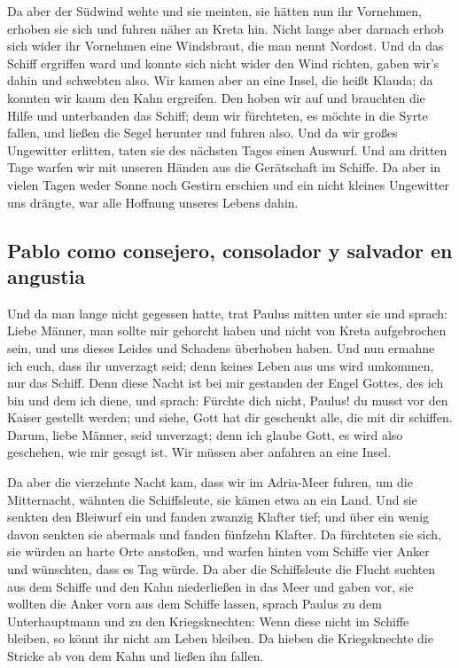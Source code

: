 Da aber der Südwind wehte und sie meinten, sie hätten
nun ihr Vornehmen, erhoben sie sich und fuhren näher an Kreta hin.
 Nicht lange aber darnach erhob sich wider ihr Vornehmen
eine Windsbraut, die man nennt Nordost.  Und da das
Schiff ergriffen ward und konnte sich nicht wider den Wind richten,
gaben wir's dahin und schwebten also.  Wir kamen aber an
eine Insel, die heißt Klauda; da konnten wir kaum den Kahn ergreifen.
 Den hoben wir auf und brauchten die Hilfe und
unterbanden das Schiff; denn wir fürchteten, es möchte in die Syrte
fallen, und ließen die Segel herunter und fuhren also. 
Und da wir großes Ungewitter erlitten, taten sie des nächsten Tages
einen Auswurf.  Und am dritten Tage warfen wir mit
unseren Händen aus die Gerätschaft im Schiffe.  Da aber
in vielen Tagen weder Sonne noch Gestirn erschien und ein nicht kleines
Ungewitter uns drängte, war alle Hoffnung unseres Lebens dahin.

\hypertarget{pablo-como-consejero-consolador-y-salvador-en-angustia}{%
\subsection{Pablo como consejero, consolador y salvador en
angustia}\label{pablo-como-consejero-consolador-y-salvador-en-angustia}}

 Und da man lange nicht gegessen hatte, trat Paulus
mitten unter sie und sprach: Liebe Männer, man sollte mir gehorcht haben
und nicht von Kreta aufgebrochen sein, und uns dieses Leides und
Schadens überhoben haben.  Und nun ermahne ich euch, dass
ihr unverzagt seid; denn keines Leben aus uns wird umkommen, nur das
Schiff.  Denn diese Nacht ist bei mir gestanden der Engel
Gottes, des ich bin und dem ich diene,  und sprach:
Fürchte dich nicht, Paulus! du musst vor den Kaiser gestellt werden; und
siehe, Gott hat dir geschenkt alle, die mit dir schiffen.
 Darum, liebe Männer, seid unverzagt; denn ich glaube
Gott, es wird also geschehen, wie mir gesagt ist.  Wir
müssen aber anfahren an eine Insel.

 Da aber die vierzehnte Nacht kam, dass wir im Adria-Meer
fuhren, um die Mitternacht, wähnten die Schiffsleute, sie kämen etwa an
ein Land.  Und sie senkten den Bleiwurf ein und fanden
zwanzig Klafter tief; und über ein wenig davon senkten sie abermals und
fanden fünfzehn Klafter.  Da fürchteten sie sich, sie
würden an harte Orte anstoßen, und warfen hinten vom Schiffe vier Anker
und wünschten, dass es Tag würde.  Da aber die
Schiffsleute die Flucht suchten aus dem Schiffe und den Kahn
niederließen in das Meer und gaben vor, sie wollten die Anker vorn aus
dem Schiffe lassen,  sprach Paulus zu dem Unterhauptmann
und zu den Kriegsknechten: Wenn diese nicht im Schiffe bleiben, so könnt
ihr nicht am Leben bleiben.  Da hieben die Kriegsknechte
die Stricke ab von dem Kahn und ließen ihn fallen.

